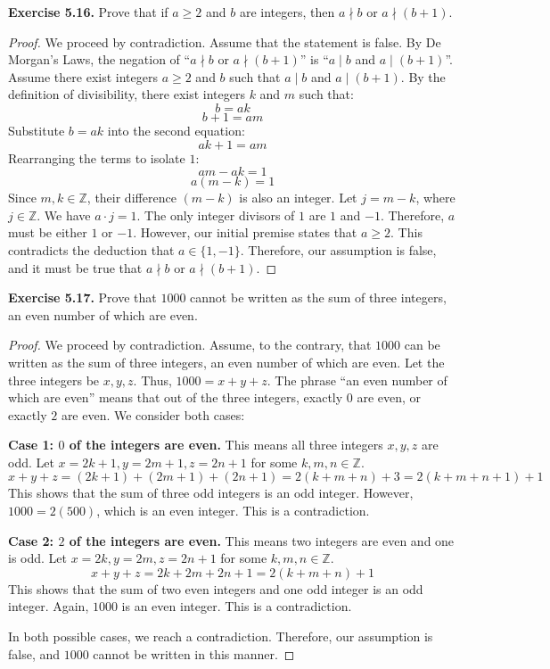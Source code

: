 \documentclass[11pt, letterpaper]{article}
\theoremstyle{remark}
\newcommand{\Z}{\mathbb{Z}}
\begin{document}
\textbf{Exercise 5.16.} Prove that if $a \ge 2$ and $b$ are integers, then $a \nmid b$ or $a \nmid (b+1)$.
\begin{proof}
We proceed by contradiction. Assume that the statement is false. By De Morgan's Laws, the negation of ``$a \nmid b$ or $a \nmid (b+1)$'' is ``$a \mid b$ and $a \mid (b+1)$''.
Assume there exist integers $a \ge 2$ and $b$ such that $a \mid b$ and $a \mid (b+1)$.
By the definition of divisibility, there exist integers $k$ and $m$ such that:
\[ b = ak \]
\[ b + 1 = am \]
Substitute $b = ak$ into the second equation:
\[ ak + 1 = am \]
Rearranging the terms to isolate $1$:
\[ am - ak = 1 \]
\[ a(m - k) = 1 \]
Since $m, k \in \Z$, their difference $(m - k)$ is also an integer. Let $j = m - k$, where $j \in \Z$.
We have $a \cdot j = 1$.
The only integer divisors of $1$ are $1$ and $-1$. Therefore, $a$ must be either $1$ or $-1$.
However, our initial premise states that $a \ge 2$. This contradicts the deduction that $a \in \{1, -1\}$.
Therefore, our assumption is false, and it must be true that $a \nmid b$ or $a \nmid (b+1)$.
\end{proof}

\textbf{Exercise 5.17.} Prove that $1000$ cannot be written as the sum of three integers, an even number of which are even.
\begin{proof}
We proceed by contradiction. Assume, to the contrary, that $1000$ can be written as the sum of three integers, an even number of which are even.
Let the three integers be $x, y, z$. Thus, $1000 = x + y + z$.
The phrase ``an even number of which are even'' means that out of the three integers, exactly $0$ are even, or exactly $2$ are even. We consider both cases:

\textbf{Case 1: $0$ of the integers are even.}
This means all three integers $x, y, z$ are odd.
Let $x = 2k+1, y = 2m+1, z = 2n+1$ for some $k, m, n \in \Z$.
\[ x + y + z = (2k+1) + (2m+1) + (2n+1) = 2(k+m+n) + 3 = 2(k+m+n+1) + 1 \]
This shows that the sum of three odd integers is an odd integer.
However, $1000 = 2(500)$, which is an even integer. This is a contradiction.

\textbf{Case 2: $2$ of the integers are even.}
This means two integers are even and one is odd.
Let $x = 2k, y = 2m, z = 2n+1$ for some $k, m, n \in \Z$.
\[ x + y + z = 2k + 2m + 2n + 1 = 2(k+m+n) + 1 \]
This shows that the sum of two even integers and one odd integer is an odd integer.
Again, $1000$ is an even integer. This is a contradiction.

In both possible cases, we reach a contradiction. Therefore, our assumption is false, and $1000$ cannot be written in this manner.
\end{proof}
\end{document}
